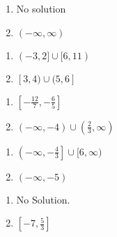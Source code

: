 \begin{multicols}{2}
\begin{enumerate}
\setcounter{enumi}{\value{HW}}

\item No solution  
\item $(-\infty, \infty)$

\setcounter{HW}{\value{enumi}}
\end{enumerate}
\end{multicols}

\begin{multicols}{2}
\begin{enumerate}
\setcounter{enumi}{\value{HW}}

\item $(-3,2] \cup [6,11)$
\item $[3, 4) \cup (5, 6]$


\setcounter{HW}{\value{enumi}}
\end{enumerate}
\end{multicols}

\begin{multicols}{2}
\begin{enumerate}
\setcounter{enumi}{\value{HW}}


\item $\left[-\frac{12}{7}, -\frac{6}{5}\right]$
\item $(-\infty, -4) \cup \left( \frac{2}{3}, \infty\right)$


\setcounter{HW}{\value{enumi}}
\end{enumerate}
\end{multicols}

\begin{multicols}{2}
\begin{enumerate}
\setcounter{enumi}{\value{HW}}

\item $\left(-\infty, -\frac{4}{3} \right] \cup [6, \infty)$

\item   $(-\infty, -5)$

\setcounter{HW}{\value{enumi}}
\end{enumerate}
\end{multicols}

\begin{multicols}{2}
\begin{enumerate}
\setcounter{enumi}{\value{HW}}

 \item   No Solution.

\item    $\left[ -7, \frac{5}{3}\right]$

\setcounter{HW}{\value{enumi}}
\end{enumerate}
\end{multicols}

